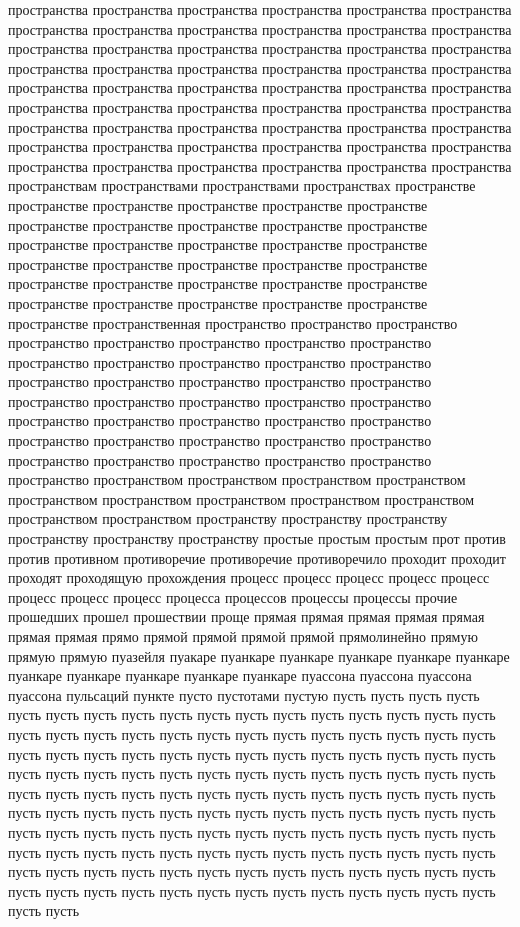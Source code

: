 пространства пространства пространства пространства пространства пространства пространства пространства пространства пространства пространства пространства пространства пространства пространства пространства пространства пространства пространства пространства пространства пространства пространства пространства пространства пространства пространства пространства пространства пространства пространства пространства пространства пространства пространства пространства пространства пространства пространства пространства пространства пространства пространства пространства пространства пространства пространства пространства пространства пространства пространства пространства пространства пространства пространствам пространствами пространствами пространствах пространстве пространстве пространстве пространстве пространстве пространстве пространстве пространстве пространстве пространстве пространстве пространстве пространстве пространстве пространстве пространстве пространстве пространстве пространстве пространстве пространстве пространстве пространстве пространстве пространстве пространстве пространстве пространстве пространстве пространстве пространстве пространстве пространственная пространство пространство пространство пространство пространство пространство пространство пространство пространство пространство пространство пространство пространство пространство пространство пространство пространство пространство пространство пространство пространство пространство пространство пространство пространство пространство пространство пространство пространство пространство пространство пространство пространство пространство пространство пространство пространство пространство пространство пространством пространством пространством пространством пространством пространством пространством пространством пространством пространством пространством пространству пространству пространству пространству пространству пространству простые простым простым прот против против противном противоречие противоречие противоречило проходит проходит проходят проходящую прохождения процесс процесс процесс процесс процесс процесс процесс процесс процесса процессов процессы процессы прочие прошедших прошел прошествии проще прямая прямая прямая прямая прямая прямая прямая прямо прямой прямой прямой прямой прямолинейно прямую прямую прямую пуазейля пуакаре пуанкаре пуанкаре пуанкаре пуанкаре пуанкаре пуанкаре пуанкаре пуанкаре пуанкаре пуанкаре пуассона пуассона пуассона пуассона пульсаций пункте пусто пустотами пустую пусть пусть пусть пусть пусть пусть пусть пусть пусть пусть пусть пусть пусть пусть пусть пусть пусть пусть пусть пусть пусть пусть пусть пусть пусть пусть пусть пусть пусть пусть пусть пусть пусть пусть пусть пусть пусть пусть пусть пусть пусть пусть пусть пусть пусть пусть пусть пусть пусть пусть пусть пусть пусть пусть пусть пусть пусть пусть пусть пусть пусть пусть пусть пусть пусть пусть пусть пусть пусть пусть пусть пусть пусть пусть пусть пусть пусть пусть пусть пусть пусть пусть пусть пусть пусть пусть пусть пусть пусть пусть пусть пусть пусть пусть пусть пусть пусть пусть пусть пусть пусть пусть пусть пусть пусть пусть пусть пусть пусть пусть пусть пусть пусть пусть пусть пусть пусть пусть пусть пусть пусть пусть пусть пусть пусть пусть пусть пусть пусть пусть пусть пусть пусть пусть пусть пусть 